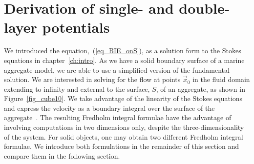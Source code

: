 %
\section{Derivation of single- and double-layer potentials}
We introduced the equation,~(\ref{eq_BIE_onS}), as a solution form to the Stokes equations in chapter~\ref{ch:intro}. As we have a solid boundary surface of a marine aggregate model, we are able to use a simplified version of the fundamental solution. We are interested in solving for the flow at points $\vec{x}_0$ in the fluid domain extending to infinity and external to the surface, $S$, of an aggregate, as shown in Figure~\ref{fig_cube10}.
We take advantage of the linearity of the Stokes equations and express the velocity as a boundary integral over the surface of the aggregate~\cite{pozrikidis_boundary_1992, stakgold_boundary_2000}. 
The resulting Fredholm integral formulae have the advantage of involving computations in two dimensions only, despite the three-dimensionality of the system.
For solid objects, one may obtain two different  Fredholm integral formulae. We introduce both formulations in the remainder of this section and compare them in the following section. 
